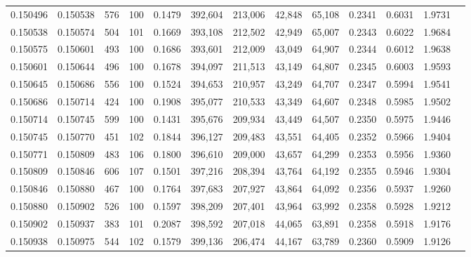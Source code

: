 \begin{tabular}{rrrrrrrrrrrrr}
0.150496 & 0.150538 &   576 & 100 &                                     0.1479 & 392,604 & 213,006 &  42,848 &  65,108 & 0.2341 & 0.6031 & 1.9731 \\
0.150538 & 0.150574 &   504 & 101 &                                     0.1669 & 393,108 & 212,502 &  42,949 &  65,007 & 0.2343 & 0.6022 & 1.9684 \\
0.150575 & 0.150601 &   493 & 100 &                                     0.1686 & 393,601 & 212,009 &  43,049 &  64,907 & 0.2344 & 0.6012 & 1.9638 \\
0.150601 & 0.150644 &   496 & 100 &                                     0.1678 & 394,097 & 211,513 &  43,149 &  64,807 & 0.2345 & 0.6003 & 1.9593 \\
0.150645 & 0.150686 &   556 & 100 &                                     0.1524 & 394,653 & 210,957 &  43,249 &  64,707 & 0.2347 & 0.5994 & 1.9541 \\
0.150686 & 0.150714 &   424 & 100 &                                     0.1908 & 395,077 & 210,533 &  43,349 &  64,607 & 0.2348 & 0.5985 & 1.9502 \\
0.150714 & 0.150745 &   599 & 100 &                                     0.1431 & 395,676 & 209,934 &  43,449 &  64,507 & 0.2350 & 0.5975 & 1.9446 \\
0.150745 & 0.150770 &   451 & 102 &                                     0.1844 & 396,127 & 209,483 &  43,551 &  64,405 & 0.2352 & 0.5966 & 1.9404 \\
0.150771 & 0.150809 &   483 & 106 &                                     0.1800 & 396,610 & 209,000 &  43,657 &  64,299 & 0.2353 & 0.5956 & 1.9360 \\
0.150809 & 0.150846 &   606 & 107 &                                     0.1501 & 397,216 & 208,394 &  43,764 &  64,192 & 0.2355 & 0.5946 & 1.9304 \\
0.150846 & 0.150880 &   467 & 100 &                                     0.1764 & 397,683 & 207,927 &  43,864 &  64,092 & 0.2356 & 0.5937 & 1.9260 \\
0.150880 & 0.150902 &   526 & 100 &                                     0.1597 & 398,209 & 207,401 &  43,964 &  63,992 & 0.2358 & 0.5928 & 1.9212 \\
0.150902 & 0.150937 &   383 & 101 &                                     0.2087 & 398,592 & 207,018 &  44,065 &  63,891 & 0.2358 & 0.5918 & 1.9176 \\
0.150938 & 0.150975 &   544 & 102 &                                     0.1579 & 399,136 & 206,474 &  44,167 &  63,789 & 0.2360 & 0.5909 & 1.9126 \\

\end{tabular}
